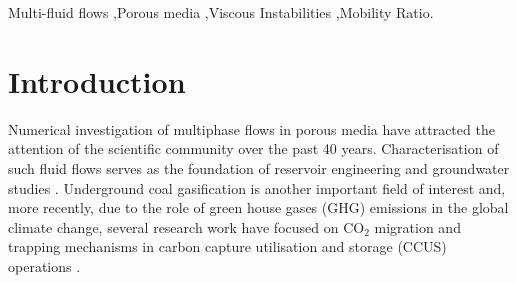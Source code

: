 \documentclass[preprint,authoryear,12pt]{elsarticle}
\begin{document}
\begin{frontmatter}
\begin{abstract}

  
\end{abstract}



\begin{keyword} %
 Multi-fluid flows \sep Porous media \sep Viscous Instabilities \sep Mobility Ratio.
\end{keyword}
 
\end{frontmatter}


\clearpage

\section{Introduction}\label{section:intro}
Numerical investigation of multiphase flows in porous media have attracted the attention of the scientific community over the past 40 years. Characterisation of such fluid flows serves as the foundation of reservoir engineering and groundwater studies \citep{white_1981}. %
Underground coal gasification is another important field of interest and, more recently, due to the role of green house gases (GHG) emissions in the global climate change, several research work have focused on CO$_{2}$ migration and trapping mechanisms in carbon capture utilisation and storage (CCUS) operations \citep{spycher_2003, self_2012, jiang_2011}.
\end{document}
